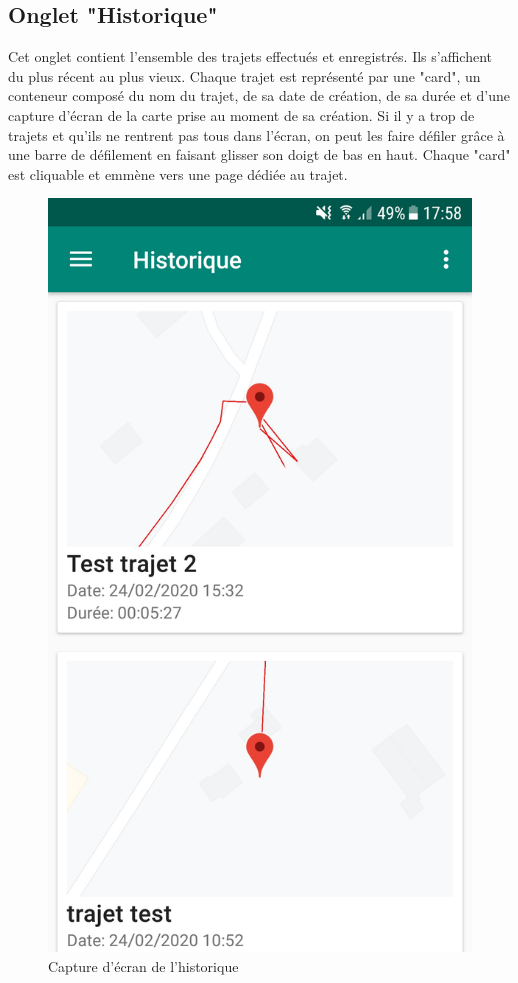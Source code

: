 \subsection{Onglet "Historique"}
Cet onglet contient l'ensemble des trajets effectués et enregistrés. Ils s'affichent du plus récent au plus vieux. Chaque trajet est représenté
par une "card", un conteneur composé du nom du trajet, de sa date de création, de sa durée et d'une capture d'écran de la carte prise au moment
de sa création. Si il y a trop de trajets et qu'ils ne rentrent pas tous dans l'écran, on peut les faire défiler grâce à une barre de défilement
en faisant glisser son doigt de bas en haut. Chaque "card" est cliquable et emmène vers une page dédiée au trajet.
\begin{figure}[ht]
  \label{Historique}
  \centering
  \includegraphics[scale=0.115]{images/historique.png}
  \caption{Capture d'écran de l'historique}
\end{figure}

